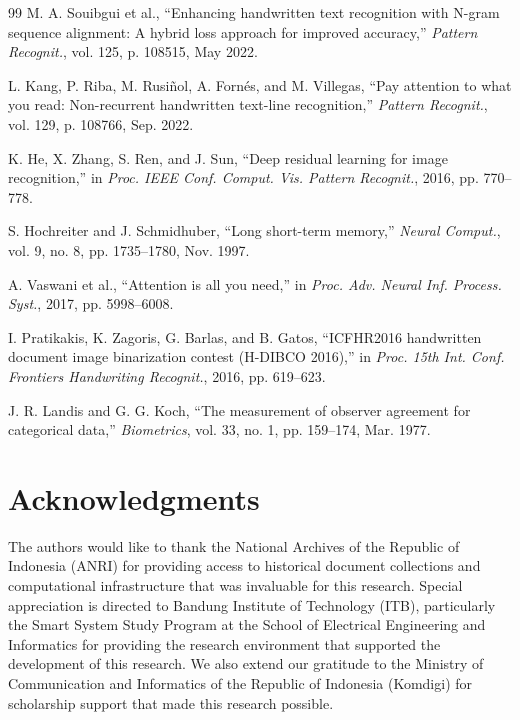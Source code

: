 \documentclass[journal]{IEEEtran}
\begin{document}
\begin{thebibliography}{99}
M. A. Souibgui et al., ``Enhancing handwritten text recognition with N-gram sequence alignment: A hybrid loss approach for improved accuracy,'' \textit{Pattern Recognit.}, vol. 125, p. 108515, May 2022.

L. Kang, P. Riba, M. Rusiñol, A. Fornés, and M. Villegas, ``Pay attention to what you read: Non-recurrent handwritten text-line recognition,'' \textit{Pattern Recognit.}, vol. 129, p. 108766, Sep. 2022.

K. He, X. Zhang, S. Ren, and J. Sun, ``Deep residual learning for image recognition,'' in \textit{Proc. IEEE Conf. Comput. Vis. Pattern Recognit.}, 2016, pp. 770--778.

S. Hochreiter and J. Schmidhuber, ``Long short-term memory,'' \textit{Neural Comput.}, vol. 9, no. 8, pp. 1735--1780, Nov. 1997.

A. Vaswani et al., ``Attention is all you need,'' in \textit{Proc. Adv. Neural Inf. Process. Syst.}, 2017, pp. 5998--6008.

I. Pratikakis, K. Zagoris, G. Barlas, and B. Gatos, ``ICFHR2016 handwritten document image binarization contest (H-DIBCO 2016),'' in \textit{Proc. 15th Int. Conf. Frontiers Handwriting Recognit.}, 2016, pp. 619--623.

J. R. Landis and G. G. Koch, ``The measurement of observer agreement for categorical data,'' \textit{Biometrics}, vol. 33, no. 1, pp. 159--174, Mar. 1977.

\end{thebibliography}

\section*{Acknowledgments}

The authors would like to thank the National Archives of the Republic of Indonesia (ANRI) for providing access to historical document collections and computational infrastructure that was invaluable for this research. Special appreciation is directed to Bandung Institute of Technology (ITB), particularly the Smart System Study Program at the School of Electrical Engineering and Informatics for providing the research environment that supported the development of this research. We also extend our gratitude to the Ministry of Communication and Informatics of the Republic of Indonesia (Komdigi) for scholarship support that made this research possible.
\end{document}
